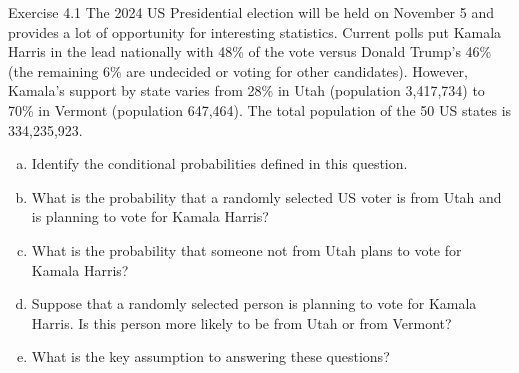 \documentclass[aspectratio=169,xcolor=pdftex,dvipsnames,table]{beamer}\usepackage[]{graphicx}\usepackage[]{xcolor}
\begin{document}
\begin{frame}{Exercise 4.1}
The 2024 US Presidential election will be held on November 5 and provides a lot of opportunity for interesting statistics. Current polls put Kamala Harris in the lead nationally with 48\% of the vote versus Donald Trump's 46\% (the remaining 6\% are undecided or voting for other candidates). However, Kamala's support by state varies from 28\% in Utah (population 3,417,734) to 70\% in Vermont (population 647,464). The total population of the 50 US states is 334,235,923. 

\begin{enumerate}[a)]
\item Identify the conditional probabilities defined in this question.

\item What is the probability that a randomly selected US voter is from Utah and is planning to vote for Kamala Harris?

\item What is the probability that someone not from Utah plans to vote for Kamala Harris?

\item Suppose that a randomly selected person is planning to vote for Kamala Harris. Is this person more likely to be from Utah or from Vermont? 

\item What is the key assumption to answering these questions?
\end{enumerate}

\end{frame}
\end{document}
